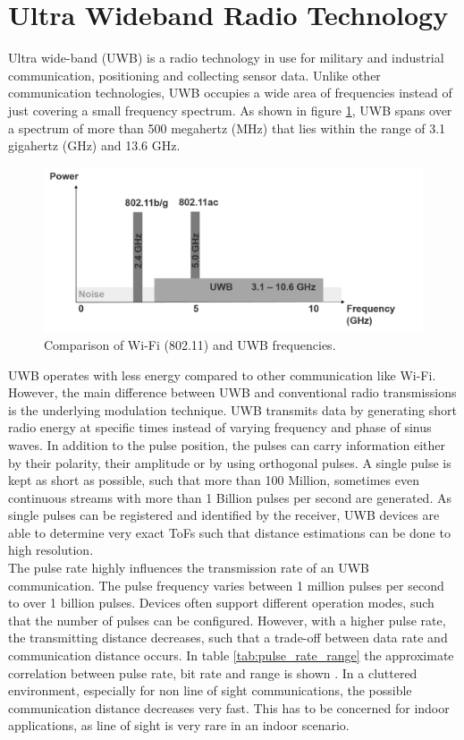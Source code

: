 \section{Ultra Wideband Radio Technology}
Ultra wide-band (UWB) is a radio technology in use for military and industrial communication, positioning and collecting sensor data. Unlike other communication technologies, UWB occupies a wide area of frequencies instead of just covering a small frequency spectrum. As shown in figure \ref{fig:frequency_spectrum}, UWB spans over a spectrum of more than 500 megahertz (MHz) that lies within the range of 3.1 gigahertz (GHz) and 13.6 GHz.
\begin{figure}[th]
\centering
\includegraphics[width=1.0\textwidth]{Figures/frequency_spectrum}
\decoRule
\caption[UWB Frequency Spectrum]{Comparison of Wi-Fi (802.11) and UWB frequencies.}
\label{fig:frequency_spectrum}
\end{figure}
UWB operates with less energy compared to other communication like Wi-Fi. However, the main difference between UWB and conventional radio transmissions is the underlying modulation technique. UWB transmits data by generating short radio energy at specific times instead of varying frequency and phase of sinus waves. In addition to the pulse position, the pulses can carry information either by their polarity, their amplitude or by using orthogonal pulses.
A single pulse is kept as short as possible, such that more than 100 Million, sometimes even continuous streams with more than 1 Billion pulses per second are generated. As single pulses can be registered and identified by the receiver, UWB devices are able to determine very exact ToFs such that distance estimations can be done to high resolution.\\
\noindent\hspace*{5mm}%
The pulse rate highly influences the transmission rate of an UWB communication. The pulse frequency varies between 1 million pulses per second to over 1 billion pulses. Devices often support different operation modes, such that the number of pulses can be configured. However, with a higher pulse rate, the transmitting distance decreases, such that a trade-off between data rate and communication distance occurs. In table \ref{tab:pulse_rate_range} the approximate correlation between pulse rate, bit rate and range is shown \cite{ITU}. In a cluttered environment, especially for non line of sight communications, the possible communication distance decreases very fast. This has to be concerned for indoor applications, as line of sight is very rare in an indoor scenario.

